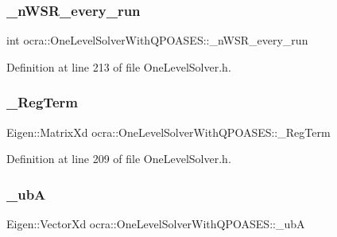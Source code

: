 \subsubsection{\texorpdfstring{\+\_\+n\+W\+S\+R\+\_\+every\+\_\+run}{\_nWSR\_every\_run}}
{\footnotesize\ttfamily int ocra\+::\+One\+Level\+Solver\+With\+Q\+P\+O\+A\+S\+E\+S\+::\+\_\+n\+W\+S\+R\+\_\+every\+\_\+run\hspace{0.3cm}{\ttfamily [protected]}}



Definition at line 213 of file One\+Level\+Solver.\+h.

\hypertarget{classocra_1_1OneLevelSolverWithQPOASES_a586d9c2c84fac9044466d33dabac9f79}{}\label{classocra_1_1OneLevelSolverWithQPOASES_a586d9c2c84fac9044466d33dabac9f79} 
\subsubsection{\texorpdfstring{\+\_\+\+Reg\+Term}{\_RegTerm}}
{\footnotesize\ttfamily Eigen\+::\+Matrix\+Xd ocra\+::\+One\+Level\+Solver\+With\+Q\+P\+O\+A\+S\+E\+S\+::\+\_\+\+Reg\+Term\hspace{0.3cm}{\ttfamily [protected]}}



Definition at line 209 of file One\+Level\+Solver.\+h.

\hypertarget{classocra_1_1OneLevelSolverWithQPOASES_a9e476513e7486c38bdb69c8fdd3b35d1}{}\label{classocra_1_1OneLevelSolverWithQPOASES_a9e476513e7486c38bdb69c8fdd3b35d1} 
\subsubsection{\texorpdfstring{\+\_\+ubA}{\_ubA}}
{\footnotesize\ttfamily Eigen\+::\+Vector\+Xd ocra\+::\+One\+Level\+Solver\+With\+Q\+P\+O\+A\+S\+E\+S\+::\+\_\+ubA\hspace{0.3cm}{\ttfamily [protected]}}



